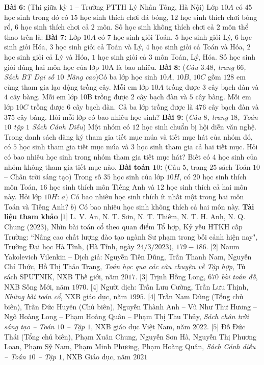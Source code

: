 \begin{multicols}{2}
	\vskip 0.1cm
	\textbf{\color{diendantoanhoc}Bài $\pmb6$:} (Thi giữa kỳ $1$ -- Trường PTTH Lý Nhân Tông, Hà Nội) Lớp $10A$ có $45$ học sinh trong đó có $15$ học sinh thích chơi đá bóng, $12$ học sinh thích chơi bóng rổ, $6$ học sinh thích chơi cả $2$ môn. Số học sinh không thích chơi cả $2$ môn thể thao trên là:
	\vskip 0.1cm
	\textbf{\color{diendantoanhoc}Bài $\pmb7$:} Lớp $10A$ có $7$ học sinh giỏi Toán, $5$ học sinh giỏi Lý, $6$ học sinh giỏi Hóa, $3$ học sinh giỏi cả Toán và Lý, $4$ học sinh giỏi cả Toán và Hóa, $2$ học sinh giỏi cả Lý và Hóa, $1$ học sinh giỏi cả $3$ môn Toán, Lý, Hóa. Số học sinh giỏi đúng hai môn học của lớp 10A là bao nhiêu.
	\vskip 0.1cm
	\textbf{\color{diendantoanhoc}Bài $\pmb8$:} (\textit{Câu $3.48$, trang $66$, Sách BT Đại số $10$ Nâng cao})Có ba lớp học sinh $10A$, $10B$, $10C$ gồm $128$ em cùng tham gia lạo động trồng cây. Mỗi em lớp $10A$ trồng được $3$ cây bạch đàn và $4$ cây bàng. Mỗi em lớp 10B trồng được $2$ cây bạch đàn và $5$ cây bàng. Mỗi em lớp $10C$ trồng được $6$ cây bạch đàn. Cả ba lớp trồng được là $476$ cây bạch đàn và $375$ cây bàng. Hỏi mỗi lớp có bao nhiêu học sinh?
	\vskip 0.1cm
	\textbf{\color{diendantoanhoc}Bài $\pmb9$:} (\textit{Câu $8$, trang $18$, Toán $10$ tập $1$ Sách Cánh Diều}) Một nhóm có $12$ học sinh chuẩn bị hội diễn văn nghệ. Trong danh sách đăng ký tham gia tiết mục múa và tiết mục hát của nhóm đó, có $5$ học sinh tham gia tiết mục múa và $3$ học sinh tham gia cả hai tiết mục. Hỏi có bao nhiêu học sinh trong nhóm tham gia tiết mục hát? Biết có $4$ học sinh của nhóm không tham gia tiết mục nào.
	\vskip 0.1cm
	\textbf{\color{diendantoanhoc}Bài toán $\pmb10$:} (Câu $5$, trang $25$ sách Toán $10$ -- Chân trời sáng tạo) Trong số $35$ học sinh của lớp $10H$, có $20$ học sinh thích môn Toán, $16$ học sinh thích môn Tiếng Anh và $12$ học sinh thích cả hai môn này. Hỏi lớp $10H$:
	\vskip 0.1cm
	$a)$ Có bao nhiêu học sinh thích ít nhất một trong hai môn Toán và Tiếng Anh?
	\vskip 0.1cm
	$b)$ Có bao nhiêu học sinh không thích cả hai môn này.
	\vskip 0.1cm
	\textbf{\color{diendantoanhoc}Tài liệu tham khảo}
	\vskip 0.1cm
	[$1$]	L. V. An, N. T. Sơn, N. T. Thiêm, N. T. H. Anh, N. Q. Chung ($2023$), Nhìn bài toán cổ theo quan điểm Tổ hợp, Kỷ yếu HTKH cấp Trường: ``Nâng cao chất lượng đào tạo ngành Sư phạm trong bối cảnh hiện nay", Trường Đại học Hà Tĩnh, (Hà Tĩnh, ngày $24/3/2023$), $179 - 186$.
	\vskip 0.1cm
	[$2$] Naum Yakolevich Vilenkin -- Dịch giả: Nguyễn Tiến Dũng, Trần Thanh Nam, Nguyễn Chí Thức, Hồ Thị Thảo Trang, \textit{Toán học qua các câu chuyện về Tập hợp}, Tủ sách SPUTNIK, NXB Thế giới, năm $2017$.
	\vskip 0.1cm
	[$3$] Trịnh Hồng Long, \textit{$670$ bài toán đố}, NXB Sống Mới, năm $1970$.
	\vskip 0.1cm
	[$4$] Người dịch: Trần Lưu Cường, Trần Lưu Thịnh, \textit{Những bài toán cổ}, NXB giáo dục, năm $1995$.
	\vskip 0.1cm
	[$4$] Trần Nam Dũng (Tổng chủ biên), Trần Đức Huyên (Chủ biên), Nguyễn Thành Anh -- Vũ Như Thư Hương -- Ngô Hoàng Long -- Phạm Hoàng Quân -- Phạm Thị Thu Thủy, \textit{Sách chân trời sáng tạo -- Toán $10$ -- Tập $1$}, NXB giáo dục Việt Nam, năm $2022$.
	\vskip 0.1cm
	[$5$]	Đỗ Đức Thái (Tổng chủ biên), Phạm Xuân Chung, Nguyễn Sơn Hà, Nguyễn Thị Phương Loan, Phạm Sỹ Nam, Phạm Minh Phương, Phạm Hoàng Quân, \textit{Sách Cánh diều -- Toán $10$ -- Tập $1$}, NXB Giáo dục, năm $2021$	
\end{multicols}